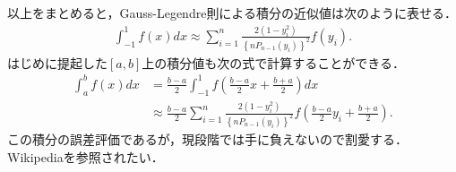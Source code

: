 \documentclass[a4j,papersize,disablejfam,slide,14pt]{jsarticle}
\begin{document}
    以上をまとめると，{\rm Gauss-Legendre}則による積分の近似値は次のように表せる．
    \begin{align}
    	\int_{-1}^{1} f(x) dx \approx \sum_{i=1}^{n} \frac{2(1-y_i^2)}{ \left\{nP_{n-1}(y_i) \right\}^2} f(y_i).
    \end{align}
    はじめに提起した$[a, b]$上の積分値も次の式で計算することができる．
    \begin{align}
    	\int_{a}^{b} f(x) dx &= \frac{b-a}{2} \int_{-1}^{1} f\left( \frac{b-a}{2}x + \frac{b+a}{2} \right) dx \\
        &\approx \frac{b-a}{2} \sum_{i=1}^{n} \frac{2(1-y_i^2)}{ \left\{nP_{n-1}(y_i) \right\}^2} f\left( \frac{b-a}{2}y_i + \frac{b+a}{2} \right).
    \end{align}
    この積分の誤差評価であるが，現段階では手に負えないので割愛する．{\rm Wikipedia}を参照されたい．
    
\end{document}
